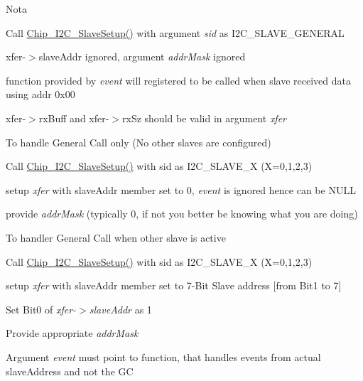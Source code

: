 \begin{DoxyNote}{Nota}
\begin{DoxyItemize}
\item Call \hyperlink{group___i2_c__18_x_x__43_x_x_gaf6ea40668dde26e406f76ff3ddeda527}{Chip\+\_\+\+I2\+C\+\_\+\+Slave\+Setup()} with argument {\itshape sid} as I2\+C\+\_\+\+S\+L\+A\+V\+E\+\_\+\+G\+E\+N\+E\+R\+AL
\begin{DoxyItemize}
\item xfer-\/$>$slave\+Addr ignored, argument {\itshape addr\+Mask} ignored
\item function provided by {\itshape event} will registered to be called when slave received data using addr 0x00
\item xfer-\/$>$rx\+Buff and xfer-\/$>$rx\+Sz should be valid in argument {\itshape xfer} 
\end{DoxyItemize}
\item To handle General Call only (No other slaves are configured)
\begin{DoxyItemize}
\item Call \hyperlink{group___i2_c__18_x_x__43_x_x_gaf6ea40668dde26e406f76ff3ddeda527}{Chip\+\_\+\+I2\+C\+\_\+\+Slave\+Setup()} with sid as I2\+C\+\_\+\+S\+L\+A\+V\+E\+\_\+X (X=0,1,2,3)
\item setup {\itshape xfer} with slave\+Addr member set to 0, {\itshape event} is ignored hence can be N\+U\+LL
\item provide {\itshape addr\+Mask} (typically 0, if not you better be knowing what you are doing)
\end{DoxyItemize}
\item To handler General Call when other slave is active
\begin{DoxyItemize}
\item Call \hyperlink{group___i2_c__18_x_x__43_x_x_gaf6ea40668dde26e406f76ff3ddeda527}{Chip\+\_\+\+I2\+C\+\_\+\+Slave\+Setup()} with sid as I2\+C\+\_\+\+S\+L\+A\+V\+E\+\_\+X (X=0,1,2,3)
\item setup {\itshape xfer} with slave\+Addr member set to 7-\/\+Bit Slave address \mbox{[}from Bit1 to 7\mbox{]}
\item Set Bit0 of {\itshape xfer-\/$>$slave\+Addr} as 1
\item Provide appropriate {\itshape addr\+Mask} 
\item Argument {\itshape event} must point to function, that handles events from actual slave\+Address and not the GC 
\end{DoxyItemize}
\end{DoxyItemize}
\end{DoxyNote}
